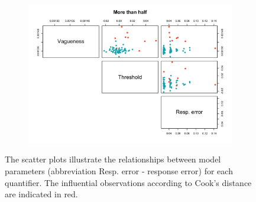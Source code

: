 \documentclass{article}
\begin{document}
\begin{figure} [H]
\begin{minipage}[b]{0.49\textwidth}
    \vspace*{4mm}
    \begin{subfigure}[b]{\linewidth}
     \includegraphics[width=\linewidth]{Figure2.11e.png}
     \caption{\label{fig:fig2.11e}}
    \end{subfigure}
    \end{minipage}
    
    \caption{The scatter plots illustrate the relationships between model parameters (abbreviation Resp. error - response error) for each quantifier. The influential observations according to Cook’s distance are indicated in red.}
    \label{fig:fig2.11}
\end{figure}
\end{document}

